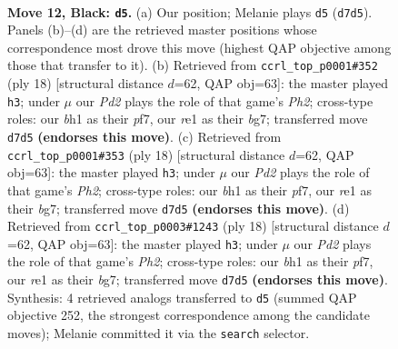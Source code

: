 \documentclass[11pt]{article}
\begin{document}
\clearpage

\begin{figure}[p]\centering
\begin{subfigure}{0.46\textwidth}\centering
\resizebox{\linewidth}{!}{%
\newchessgame
\chessboard[
  setfen={r1bq1rk1/pp1p2bp/2n3p1/2p1pp1n/2P4P/4PNP1/PP1P1P2/RNBQRK1B b - - 1 12},
  showmover=false,
  pgfstyle=straightmove, color=movearrow, markmove={d7-d5}
]}
\caption{}
\end{subfigure}\hfill
\begin{subfigure}{0.46\textwidth}\centering
\resizebox{\linewidth}{!}{%
\newchessgame
\chessboard[
  setfen={rnbqr1k1/pp3pbp/2pp1np1/8/2PNP3/2N3P1/PP3PBP/R1BQ1RK1 w - - 1 10},
  showmover=false,
  pgfstyle=straightmove, color=movearrow, markmove={h2-h3}
]}
\caption{}
\end{subfigure}
\\[4pt]
\begin{subfigure}{0.46\textwidth}\centering
\resizebox{\linewidth}{!}{%
\newchessgame
\chessboard[
  setfen={rnbqr1k1/pp3pbp/2pp1np1/8/2PNP3/2N3P1/PP3PBP/R1BQ1RK1 w - - 1 10},
  showmover=false,
  pgfstyle=straightmove, color=movearrow, markmove={h2-h3}
]}
\caption{}
\end{subfigure}\hfill
\begin{subfigure}{0.46\textwidth}\centering
\resizebox{\linewidth}{!}{%
\newchessgame
\chessboard[
  setfen={rnbqr1k1/pp3pbp/2pp1np1/8/2PNP3/2N3P1/PP3PBP/R1BQ1RK1 w - - 3 10},
  showmover=false,
  pgfstyle=straightmove, color=movearrow, markmove={h2-h3}
]}
\caption{}
\end{subfigure}
\caption{\textbf{Move 12, Black: \texttt{d5}.} (a) Our position; Melanie plays \texttt{d5} (\texttt{d7d5}). Panels (b)--(d) are the retrieved master positions whose correspondence most drove this move (highest QAP objective among those that transfer to it). (b) Retrieved from \texttt{ccrl\_top\_p0001\#352} (ply 18) [structural distance $d$=62, QAP obj=63]: the master played \texttt{h3}; under $\mu$ our \emph{Pd2} plays the role of that game's \emph{Ph2}; cross-type roles: our \emph{b}h1 as their \emph{p}f7, our \emph{r}e1 as their \emph{b}g7; transferred move \texttt{d7d5} \textbf{(endorses this move)}. (c) Retrieved from \texttt{ccrl\_top\_p0001\#353} (ply 18) [structural distance $d$=62, QAP obj=63]: the master played \texttt{h3}; under $\mu$ our \emph{Pd2} plays the role of that game's \emph{Ph2}; cross-type roles: our \emph{b}h1 as their \emph{p}f7, our \emph{r}e1 as their \emph{b}g7; transferred move \texttt{d7d5} \textbf{(endorses this move)}. (d) Retrieved from \texttt{ccrl\_top\_p0003\#1243} (ply 18) [structural distance $d$=62, QAP obj=63]: the master played \texttt{h3}; under $\mu$ our \emph{Pd2} plays the role of that game's \emph{Ph2}; cross-type roles: our \emph{b}h1 as their \emph{p}f7, our \emph{r}e1 as their \emph{b}g7; transferred move \texttt{d7d5} \textbf{(endorses this move)}. Synthesis: 4 retrieved analogs transferred to \texttt{d5} (summed QAP objective 252, the strongest correspondence among the candidate moves); Melanie committed it via the \texttt{search} selector.}
\label{fig:thought-m23}
\end{figure}
\end{document}
